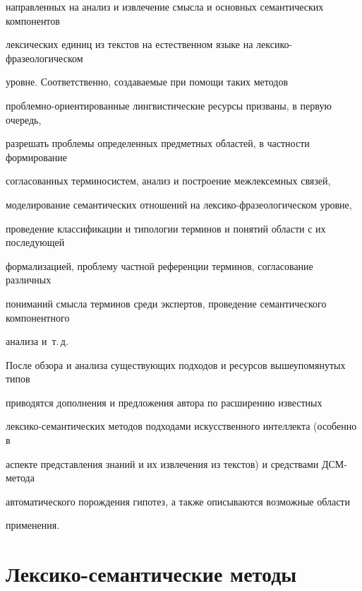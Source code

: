 направленных на анализ и извлечение смысла и основных семантических компонентов 


лексических единиц из текстов на естественном языке на лексико-фразеологическом 


уровне. Соответственно, создаваемые при помощи таких методов 


   проблемно-ориентированные лингвистические ресурсы призваны, в первую очередь, 


разрешать проблемы определенных предметных областей, в частности формирование 


согласованных терминосистем, анализ и построение межлексемных связей, 


моделирование семантических отношений на лексико-фра\-зе\-о\-ло\-ги\-че\-ском уровне, 


проведение классификации и типологии терминов и понятий области с их последующей 


формализацией, проблему частной референции терминов, согласование различных 


пониманий смысла терминов среди экспертов, проведение семантического компонентного 


анализа и~т.\,д. 


   


   После обзора и анализа существующих подходов и ресурсов вышеупомянутых типов 


приводятся дополнения и предложения автора по расширению известных 


   лек\-си\-ко-семантических методов подходами искусственного интеллекта (особенно в 


аспекте представления знаний и их извлечения из текстов) и средствами ДСМ-ме\-то\-да 


автоматического порождения гипотез, а также описываются возможные области 


применения.





\vspace*{-9pt}





\section{Лексико-семантические методы}





\vspace*{-2pt}





